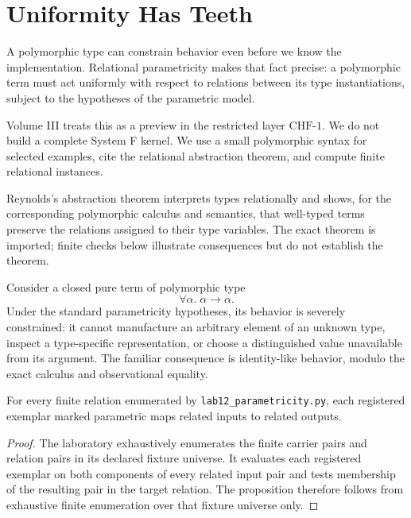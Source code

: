 \chapter{Uniformity Has Teeth}
\label{ch:parametricity}

A polymorphic type can constrain behavior even before we know the implementation. Relational parametricity makes that fact precise: a polymorphic term must act uniformly with respect to relations between its type instantiations, subject to the hypotheses of the parametric model.

Volume III treats this as a preview in the restricted layer $\mathrm{CHF}\text{-}1$. We do not build a complete System F kernel. We use a small polymorphic syntax for selected examples, cite the relational abstraction theorem, and compute finite relational instances.



\begin{formal}[title={Imported theorem: relational parametricity}]
Reynolds's abstraction theorem interprets types relationally and shows, for the corresponding polymorphic calculus and semantics, that well-typed terms preserve the relations assigned to their type variables. The exact theorem is imported; finite checks below illustrate consequences but do not establish the theorem.
\end{formal}

Consider a closed pure term of polymorphic type
\[
\forall\alpha.\;\alpha\to\alpha.
\]
Under the standard parametricity hypotheses, its behavior is severely constrained: it cannot manufacture an arbitrary element of an unknown type, inspect a type-specific representation, or choose a distinguished value unavailable from its argument. The familiar consequence is identity-like behavior, modulo the exact calculus and observational equality.



\begin{proposition}
For every finite relation enumerated by \texttt{lab12\_parametricity.py}, each registered exemplar marked parametric maps related inputs to related outputs.
\end{proposition}
\begin{proof}
The laboratory exhaustively enumerates the finite carrier pairs and relation pairs in its declared fixture universe. It evaluates each registered exemplar on both components of every related input pair and tests membership of the resulting pair in the target relation. The proposition therefore follows from exhaustive finite enumeration over that fixture universe only.
\end{proof}

